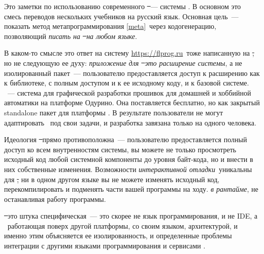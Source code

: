 {}

Это заметки по использованию современного \st\ --- системы \ph. В основном это смесь переводов нескольких учебников
на русский язык. Основная цель\ --- показать метод метапрограммирования \ref{meta}\ через кодогенерацию,
позволяющий \emph{писать на \st\ \textit{на любом языке}}.

В каком-то смысле это ответ на систему \url{https://flprog.ru}\ тоже написанную на \st, но не следующую ее духу:
\emph{приложение для \st\ это \textit{расширение системы}}, а не изолированный пакет\ --- пользователю предоставляется доступ к расширению
как к библиотеке, с полным доступом и к ее исходному коду,
и к базовой системе. \fl\ --- система для графической разработки прошивок для домашней и хоббийной автоматики на платформе Одурино.
Она поставляется бесплатно, но как закрытый standalone пакет для платформы \win{}.
В результате пользователи не могут адаптировать \fl\ под
свои задачи, и разработка завязана только на одного человека.

Идеология \st\ прямо противоположна\ --- пользователю предоставляется полный доступ ко всем внутренностям системы, вы можете не только
просмотреть исходный код любой системной компоненты до уровня байт-кода, но и внести в них собственные изменения. Возможности
\emph{интерактивной отладки}\ уникальны для \st, ни в одном другом языке вы не можете изменять исходный код, перекомпилировать и подменять
части вашей программы на ходу. \emph{в рантайме}, не останавливая работу программы.

\st\ это штука специфическая\ --- это скорее не язык программирования, и не IDE, а \ работающая поверх другой платформы,
со своим языком, архитектурой, и именно этим объясняется ее изолированность, и определенные проблемы интеграции
с другими языками программирования и сервисами .

